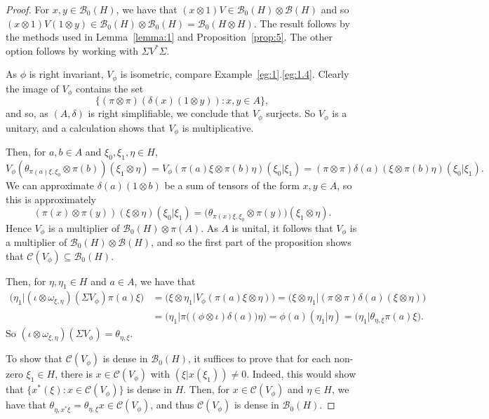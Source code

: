 \documentclass[a4paper,12pt]{article}
\theoremstyle{plain}
\theoremstyle{definition}
\newcommand{\mc}{\mathcal}
\begin{document}
\begin{proof}
For $x,y\in\mc B_0(H)$, we have that $(x\otimes 1)V \in
\mc B_0(H) \otimes \mc B(H)$ and so $(x\otimes 1)V(1\otimes y)
\in \mc B_0(H) \otimes \mc B_0(H) = \mc B_0(H\otimes H)$.
The result follows by the methods used in Lemma~\ref{lemma:1} and
Proposition~\ref{prop:5}.  The other option follows by working
with $\Sigma V^* \Sigma$.

As $\phi$ is right invariant, $V_\phi$ is isometric, compare
Example~\ref{eg:1}.\ref{eg:1.4}.
Clearly the image of $V_\phi$ contains the set
\[ \big\{ (\pi\otimes\pi)(\delta(x)(1\otimes y)) : x,y\in A \big\}, \]
and so, as $(A,\delta)$ is right simplifiable, we conclude that $V_\phi$
surjects.  So $V_\phi$ is a unitary, and a calculation shows that $V_\phi$
is multiplicative.

Then, for $a,b\in A$ and $\xi_0,\xi_1,\eta\in H$,
\[ V_\phi (\theta_{\pi(a)\xi,\xi_0}\otimes\pi(b))(\xi_1\otimes\eta)
= V_\phi (\pi(a)\xi\otimes\pi(b)\eta) (\xi_0|\xi_1)
= (\pi\otimes\pi)\delta(a)(\xi\otimes\pi(b)\eta) (\xi_0|\xi_1). \]
We can approximate $\delta(a)(1\otimes b)$ be a sum of tensors of the
form $x,y\in A$, so this is approximately
\[ (\pi(x)\otimes\pi(y))(\xi\otimes\eta) (\xi_0|\xi_1)
= \big(\theta_{\pi(x)\xi, \xi_0} \otimes \pi(y)\big)(\xi_1\otimes\eta). \]
Hence $V_\phi$ is a multiplier of $\mc B_0(H)\otimes\pi(A)$.  As $A$ is
unital, it follows that $V_\phi$ is a multiplier of
$\mc B_0(H)\otimes\mc B(H)$, and so the first part of the proposition shows
that $\mc C(V_\phi) \subseteq\mc B_0(H)$.

Then, for $\eta,\eta_1\in H$ and $a\in A$, we have that
\begin{align*}
\big( \eta_1 \big| (\iota\otimes\omega_{\xi,\eta})(\Sigma V_\phi) \pi(a)\xi \big)
&= \big( \xi\otimes\eta_1 \big| V_\phi(\pi(a)\xi\otimes\eta) \big)
= \big( \xi\otimes\eta_1 \big| (\pi\otimes\pi)\delta(a)(\xi\otimes\eta) \big) \\
&= \big( \eta_1 \big| \pi\big( (\phi\otimes\iota)\delta(a) \big) \eta \big)
= \phi(a) (\eta_1|\eta)
= \big( \eta_1 \big| \theta_{\eta,\xi} \pi(a) \xi \big).
\end{align*}
So $(\iota\otimes\omega_{\xi,\eta})(\Sigma V_\phi) = \theta_{\eta,\xi}$.

To show that $\mc C(V_\phi)$ is dense in $\mc B_0(H)$, it suffices to prove
that for each non-zero $\xi_1\in H$, there is $x\in\mc C(V_\phi)$ with
$(\xi|x(\xi_1))\not=0$.  Indeed, this would show that $\{ x^*(\xi) :
x\in\mc C(V_\phi)\}$ is dense in $H$.  Then, for $x\in\mc C(V_\phi)$ and
$\eta\in H$, we have that $\theta_{\eta,x^*\xi} = \theta_{\eta,\xi} x
\in\mc C(V_\phi)$, and thus $\mc C(V_\phi)$ is dense in $\mc B_0(H)$.


\end{proof}
\end{document}

